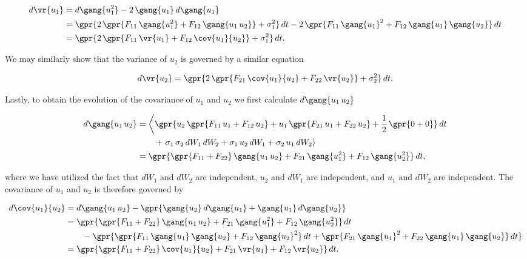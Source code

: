 \begin{enumerate}[a)]
	\begin{align}
		d\vr{u_1} &= d\gang{u_1^2} - 2\,\gang{u_1}\,d\gang{u_1} \nonumber \\
			&= \gpr{2\,\gpr{F_{11}\,\gang{u_1^2} + F_{12}\,\gang{u_1\,u_2}} + \sigma_1^2}\,dt - 2\,\gpr{F_{11}\,\gang{u_1}^2 + F_{12}\,\gang{u_1}\,\gang{u_2}}\,dt \nonumber \\
			&= \gpr{2\,\gpr{F_{11}\,\vr{u_1} + F_{12}\,\cov{u_1}{u_2}} + \sigma_1^2}\,dt.
	\end{align}
	
	We may similarly show that the variance of $u_2$ is governed by a similar equation
	
	\begin{equation}
		d\vr{u_2} = \gpr{2\,\gpr{F_{21}\,\cov{u_1}{u_2} + F_{22}\,\vr{u_2}} + \sigma_2^2}\,dt.
	\end{equation}
	
	Lastly, to obtain the evolution of the covariance of $u_1$ and $u_2$ we first calculate $d\gang{u_1\,u_2}$
	
	\begin{align}
		d\gang{u_1\,u_2} &= \left\langle \gpr{u_2\,\gpr{F_{11}\,u_1 + F_{12}\,u_2} + u_1\,\gpr{F_{21}\,u_1 + F_{22}\,u_2} + \frac{1}{2}\,\gpr{0 + 0}}\,dt \right. \nonumber \\
				&\qquad  + \left.\sigma_1\,\sigma_2\,dW_1\,dW_2 + \sigma_1\,u_2\,dW_1 + \sigma_2\,u_1\,dW_2 \right\rangle \nonumber \\
			&= \gpr{\gpr{F_{11} + F_{22}}\,\gang{u_1\,u_2} + F_{21}\,\gang{u_1^2} + F_{12}\,\gang{u_2^2}}\,dt,
	\end{align}
	
	where we have utilized the fact that $dW_1$ and $dW_2$ are independent, $u_2$ and $dW_1$ are independent, and $u_1$ and $dW_2$ are independent. The covariance of $u_1$ and $u_2$ is therefore governed by
	
	\begin{align}
		d\cov{u_1}{u_2} &= d\gang{u_1\,u_2} - \gpr{\gang{u_2}\,d\gang{u_1} + \gang{u_1}\,d\gang{u_2}} \nonumber \\
			&= \gpr{\gpr{F_{11} + F_{22}}\,\gang{u_1\,u_2} + F_{21}\,\gang{u_1^2} + F_{12}\,\gang{u_2^2}}\,dt \nonumber \\
				&\qquad - \gpr{\gpr{F_{11}\,\gang{u_1}\,\gang{u_2} + F_{12}\,\gang{u_2}^2}\,dt  + \gpr{F_{21}\,\gang{u_1}^2 + F_{22}\,\gang{u_1}\,\gang{u_2}}\,dt} \nonumber \\
			&= \gpr{\gpr{F_{11} + F_{22}}\,\cov{u_1}{u_2} + F_{21}\,\vr{u_1} + F_{12}\,\vr{u_2}}\,dt.
	\end{align}
	

\end{enumerate}
